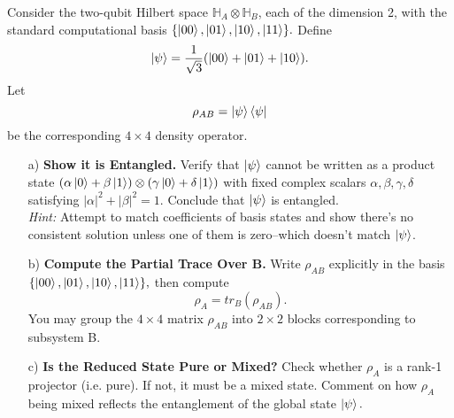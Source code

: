 \documentclass{article}
\renewcommand{\H}{\mathbb{H}}
\begin{document}
\begin{question}
    Consider the two-qubit Hilbert space $\H_A \otimes \H_B$, each of the dimension 2, with the standard computational basis $\{\ket{00},\ket{01},\ket{10},\ket{11} \}.$ Define $$\ket{\psi}=\frac{1}{\sqrt{3}}(\ket{00}+\ket{01}+\ket{10}).$$ Let $$\rho_{AB}=\ket{\psi}\bra{\psi}$$ be the corresponding $4 \times 4$ density operator.
    \begin{enumerate}
        \item[a)]\textbf{Show it is Entangled.} Verify that $\ket{\psi}$ cannot be written as a product state $(\alpha\ket{0}+\beta\ket{1})\otimes(\gamma\ket{0}+\delta\ket{1})$ with fixed complex scalars $\alpha,\beta,\gamma,\delta$ satisfying $|\alpha|^2+|\beta|^2=1.$ Conclude that $\ket{\psi}$ is entangled.\\
        \textit{Hint:} Attempt to match coefficients of basis states and show there's no consistent solution unless one of them is zero--which doesn't match $\ket{\psi}$.
        \item[b)]\textbf{Compute the Partial Trace Over B.} Write $\rho_{AB}$ explicitly in the basis $\{\ket{00}, \ket{01}, \ket{10}, \ket{11} \},$ then compute $$\rho_A=tr_B(\rho_{AB}).$$ You may group the $4 \times 4$ matrix $\rho_{AB}$ into $2 \times 2$ blocks corresponding to subsystem B.
        \item[c)] \textbf{Is the Reduced State Pure or Mixed?} Check whether $\rho_A$ is a rank-1 projector (i.e. pure). If not, it must be a mixed state. Comment on how $\rho_A$ being mixed reflects the entanglement of the global state $\ket{\psi}.$ 
    \end{enumerate}
\end{question}
\end{document}

